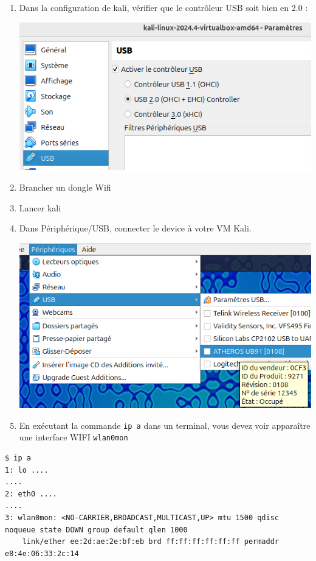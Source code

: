 \documentclass[french, 12pt]{article}%
\begin{document}
\begin{enumerate}[resume]
\item Dans la configuration de kali, vérifier que le contrôleur USB soit bien en 2.0 :
\begin{center}
\includegraphics[scale=0.7]{./ressource/usbcontroller}
\end{center}
\item Brancher un dongle Wifi
\item Lancer kali
\item Dans Périphérique/USB, connecter le device à votre VM Kali.
\begin{center}
\includegraphics[scale=0.4]{./ressource/usbConnexion}
\end{center}

\item En exécutant la commande \verb?ip a? dans un terminal, vous devez voir apparaître une interface WIFI \verb?wlan0mon?
\end{enumerate}


\begin{lstlisting}[style=commande]
$ ip a                         
1: lo ....
....
2: eth0 ....
....
3: wlan0mon: <NO-CARRIER,BROADCAST,MULTICAST,UP> mtu 1500 qdisc noqueue state DOWN group default qlen 1000
    link/ether ee:2d:ae:2e:bf:eb brd ff:ff:ff:ff:ff:ff permaddr e8:4e:06:33:2c:14
\end{lstlisting}                                                                                
\end{document}
